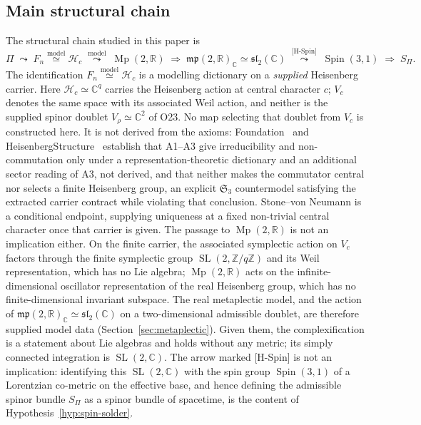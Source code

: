 \documentclass[11pt,a4paper]{article}
\theoremstyle{definition}
\theoremstyle{remark}
\newcommand{\Mp}{\operatorname{Mp}}
\newcommand{\Spin}{\operatorname{Spin}}
\newcommand{\SL}{\operatorname{SL}}
\begin{document}
    \subsection{Main structural chain}
      \label{ssec:chain}

      The structural chain studied in this paper is
      \begin{equation}
        \label{eq:main-chain}
        \Pi
        \;\leadsto\;
        F_n \overset{\text{model}}{\simeq} \mathcal{H}_c
        \;\overset{\text{model}}{\leadsto}\;
        \Mp(2,\mathbb{R})
        \;\Rightarrow\;
        \mathfrak{mp}(2,\mathbb{R})_{\mathbb{C}} \simeq \mathfrak{sl}_2(\mathbb{C})
        \;\overset{\text{[H-Spin]}}{\leadsto}\;
        \Spin(3,1)
        \;\Rightarrow\;
        S_\Pi .
      \end{equation}
      The identification $F_n \overset{\text{model}}{\simeq} \mathcal{H}_c$ is a modelling dictionary on a
      \emph{supplied} Heisenberg carrier.
      Here $\mathcal{H}_c \simeq \mathbb{C}^q$ carries the Heisenberg action at central character $c$;
      $V_c$ denotes the same space with its associated Weil action, and neither is the supplied
      spinor doublet $V_\rho \simeq \mathbb{C}^2$ of O23.
      No map selecting that doublet from $V_c$ is constructed here.
      It is not derived from the axioms: Foundation~\cite{Beau2026m} and
      HeisenbergStructure~\cite{Beau2026HeisenbergStructure} establish that A1--A3 give
      irreducibility and non-commutation only under a representation-theoretic dictionary and an additional
      sector reading of A3, not derived, and that neither makes the commutator central nor selects a
      finite Heisenberg group, an explicit $\mathfrak{S}_3$ countermodel satisfying the extracted
      carrier contract while violating that conclusion.
      Stone--von Neumann is a conditional endpoint, supplying uniqueness at a fixed non-trivial
      central character once that carrier is given.
      The passage to $\Mp(2,\mathbb{R})$ is not an implication either.
      On the finite carrier, the associated symplectic action on $V_c$ factors through the finite
      symplectic group $\SL(2,\mathbb{Z}/q\mathbb{Z})$ and its Weil representation, which has no Lie
      algebra; $\Mp(2,\mathbb{R})$ acts on the infinite-dimensional oscillator representation of the real
      Heisenberg group, which has no finite-dimensional invariant subspace.
      The real metaplectic model, and the action of
      $\mathfrak{mp}(2,\mathbb{R})_{\mathbb{C}} \simeq \mathfrak{sl}_2(\mathbb{C})$ on a two-dimensional
      admissible doublet, are therefore supplied model data (Section~\ref{sec:metaplectic}).
      Given them, the complexification is a statement about Lie algebras and holds without any metric;
      its simply connected integration is $\SL(2,\mathbb{C})$.
      The arrow marked [H-Spin] is not an implication: identifying this $\SL(2,\mathbb{C})$ with the
      spin group $\Spin(3,1)$ of a Lorentzian co-metric on the effective base, and hence defining the
      admissible spinor bundle $S_\Pi$ as a spinor bundle of spacetime, is the content of
      Hypothesis~\ref{hyp:spin-solder}.
\end{document}
